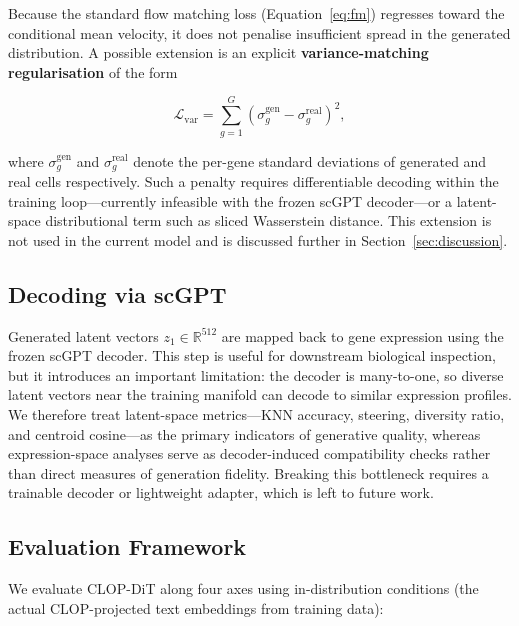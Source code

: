 \documentclass[biology,article,submit,pdftex,moreauthors]{Definitions/mdpi}
\begin{document}
Because the standard flow matching loss (Equation~\ref{eq:fm}) regresses toward the conditional mean velocity, it does not penalise insufficient spread in the generated distribution. A possible extension is an explicit \textbf{variance-matching regularisation} of the form
\begin{linenomath}
\begin{equation}
  \mathcal{L}_\text{var} = \sum_{g=1}^{G} \left( \sigma_g^{\text{gen}} - \sigma_g^{\text{real}} \right)^2,
  \label{eq:var-loss}
\end{equation}
\end{linenomath}
where $\sigma_g^{\text{gen}}$ and $\sigma_g^{\text{real}}$ denote the per-gene standard deviations of generated and real cells respectively. Such a penalty requires differentiable decoding within the training loop---currently infeasible with the frozen scGPT decoder---or a latent-space distributional term such as sliced Wasserstein distance. This extension is not used in the current model and is discussed further in Section~\ref{sec:discussion}.

\subsection{Decoding via scGPT}\label{sec:decoding}

Generated latent vectors $z_1 \in \mathbb{R}^{512}$ are mapped back to gene expression using the frozen scGPT decoder. This step is useful for downstream biological inspection, but it introduces an important limitation: the decoder is many-to-one, so diverse latent vectors near the training manifold can decode to similar expression profiles. We therefore treat latent-space metrics---KNN accuracy, steering, diversity ratio, and centroid cosine---as the primary indicators of generative quality, whereas expression-space analyses serve as decoder-induced compatibility checks rather than direct measures of generation fidelity. Breaking this bottleneck requires a trainable decoder or lightweight adapter, which is left to future work.

\subsection{Evaluation Framework}\label{sec:evaluation}

We evaluate CLOP-DiT along four axes using in-distribution conditions (the actual CLOP-projected text embeddings from training data):
\end{document}
